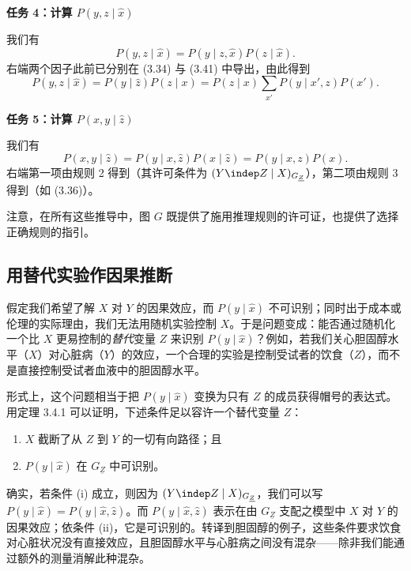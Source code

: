 \noindent\textbf{任务 4：计算 $P(y,z\mid\hat{x})$}

我们有
\[
P(y,z\mid\hat{x})=P(y\mid z,\hat{x})P(z\mid\hat{x}).
\]
右端两个因子此前已分别在 \textup{(3.34)} 与 \textup{(3.41)} 中导出，由此得到
\begin{equation}
P(y,z\mid\hat{x})=P(y\mid\hat{z})P(z\mid x)=P(z\mid x)\sum_{x'}P(y\mid x',z)P(x'). \tag{3.43}
\end{equation}

\noindent\textbf{任务 5：计算 $P(x,y\mid\hat{z})$}

我们有
\begin{equation}
P(x,y\mid\hat{z})=P(y\mid x,\hat{z})P(x\mid\hat{z})=P(y\mid x,z)P(x). \tag{3.44}
\end{equation}
右端第一项由规则 2 得到（其许可条件为 $(Y\indep Z\mid X)_{G_{\underline{Z}}}$），第二项由规则 3 得到（如 \textup{(3.36)}）。

注意，在所有这些推导中，图 $G$ 既提供了施用推理规则的许可证，也提供了选择正确规则的指引。

\subsection{用替代实验作因果推断}

假定我们希望了解 $X$ 对 $Y$ 的因果效应，而 $P(y\mid\hat{x})$ 不可识别；同时出于成本或伦理的实际理由，我们无法用随机实验控制 $X$。于是问题变成：能否通过随机化一个比 $X$ 更易控制的\emph{替代}变量 $Z$ 来识别 $P(y\mid\hat{x})$？例如，若我们关心胆固醇水平（$X$）对心脏病（$Y$）的效应，一个合理的实验是控制受试者的饮食（$Z$），而不是直接控制受试者血液中的胆固醇水平。

形式上，这个问题相当于把 $P(y\mid\hat{x})$ 变换为只有 $Z$ 的成员获得帽号的表达式。用定理 3.4.1 可以证明，下述条件足以容许一个替代变量 $Z$：
\begin{enumerate}[label=(\roman*),leftmargin=2.2em]
\item $X$ 截断了从 $Z$ 到 $Y$ 的一切有向路径；且
\item $P(y\mid\hat{x})$ 在 $G_{\underline{Z}}$ 中可识别。
\end{enumerate}
确实，若条件 (i) 成立，则因为 $(Y\indep Z\mid X)_{G_{\underline{Z}}}$，我们可以写 $P(y\mid\hat{x})=P(y\mid\hat{x},\hat{z})$。而 $P(y\mid\hat{x},\hat{z})$ 表示在由 $G_{\underline{Z}}$ 支配之模型中 $X$ 对 $Y$ 的因果效应；依条件 (ii)，它是可识别的。转译到胆固醇的例子，这些条件要求饮食对心脏状况没有直接效应，且胆固醇水平与心脏病之间没有混杂——除非我们能通过额外的测量消解此种混杂。

